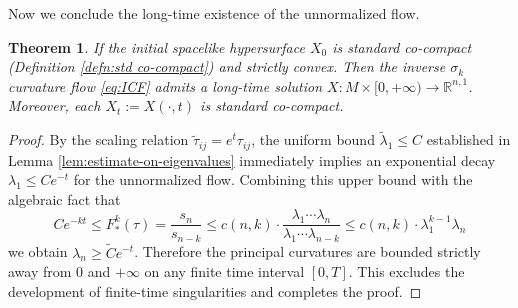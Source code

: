 \documentclass[10pt,a4paper]{amsart}
\newtheorem{theorem}{Theorem}[section]
\newcommand{\R}{\ensuremath{\mathbb{R}}}
\numberwithin{equation}{section}
\begin{document}
Now we conclude the long-time existence of the unnormalized flow. 
\begin{theorem}\label{thm:long-time}
    If the initial spacelike hypersurface \(X_0\) is standard co-compact (Definition \ref{defn:std co-compact}) and strictly convex. Then the inverse \(\sigma_k\) curvature flow \eqref{eq:ICF} admits a long-time solution \(X: M\times [0,+\infty) \to \R^{n,1}\). Moreover, each \(X_t := X(\cdot, t)\) is standard co-compact.
\end{theorem}
\begin{proof}
    By the scaling relation $\tilde{\tau}_{ij} = e^t \tau_{ij}$, the uniform bound $\tilde{\lambda}_1 \leq C$ established in Lemma \ref{lem:estimate-on-eigenvalues} immediately implies an exponential decay $\lambda_1 \leq C e^{-t}$ for the unnormalized flow. Combining this upper bound with the algebraic fact that 
    \[ Ce^{-kt} \leq F^k_*(\tau) = \frac{s_n}{s_{n-k}} \leq c(n,k)\cdot \frac{\lambda_1\cdots\lambda_n}{\lambda_1 \cdots \lambda_{n-k}} \leq c(n,k)\cdot \lambda_1^{k-1}\lambda_n \]
    we obtain \(\lambda_n \geq \tilde{C} e^{-t}\). 
    Therefore the principal curvatures are bounded strictly away from $0$ and $+\infty$ on any finite time interval $[0, T]$. This excludes the development of finite-time singularities and completes the proof. 
\end{proof}
\end{document}
